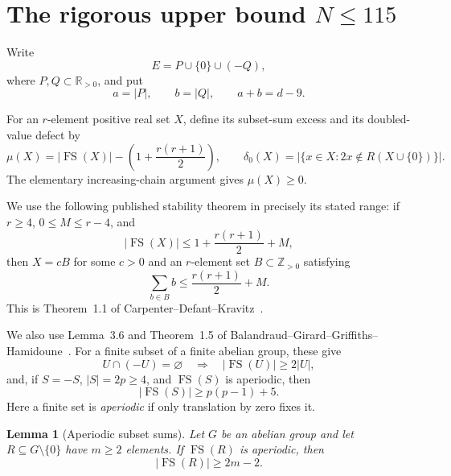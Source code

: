 \documentclass[11pt,a4paper]{article}
\newtheorem{lemma}[theorem]{Lemma}
\theoremstyle{remark}
\newcommand{\FS}{\operatorname{FS}}
\newcommand{\card}[1]{\lvert #1\rvert}
\begin{document}
\section{The rigorous upper bound \texorpdfstring{$N\leq115$}{N <= 115}}
\label{base:sec:upper}

Write
\[
 E=P\cup\{0\}\cup(-Q),
\]
where $P,Q\subset\mathbb R_{>0}$, and put
\[
 a=\card P,\qquad b=\card Q,
 \qquad a+b=d-9.
\]

For an $r$-element positive real set $X$, define its subset-sum excess and its
doubled-value defect by
\[
 \mu(X)=\card{\FS(X)}-\left(1+\frac{r(r+1)}2\right),
 \qquad
 \delta_0(X)=\card{\{x\in X:2x\notin R(X\cup\{0\})\}}.
\]
The elementary increasing-chain argument gives $\mu(X)\geq0$.

We use the following published stability theorem in precisely its stated
range: if $r\geq4$, $0\leq M\leq r-4$, and
\[
 \card{\FS(X)}\leq1+\frac{r(r+1)}2+M,
\]
then $X=cB$ for some $c>0$ and an $r$-element set
$B\subset\mathbb Z_{>0}$ satisfying
\[
 \sum_{b\in B}b\leq\frac{r(r+1)}2+M.
\]
This is Theorem~1.1 of Carpenter--Defant--Kravitz~\cite{CDK2026}.

We also use Lemma~3.6 and Theorem~1.5 of
Balandraud--Girard--Griffiths--Hamidoune~\cite{BGGH2013}.  For a finite
subset of a finite abelian group, these give
\begin{equation}
 U\cap(-U)=\varnothing\quad\Longrightarrow\quad
 \card{\FS(U)}\geq2\card U,
 \label{base:eq:antisymmetric-bound}
\end{equation}
and, if $S=-S$, $\card S=2p\geq4$, and $\FS(S)$ is aperiodic, then
\begin{equation}
 \card{\FS(S)}\geq p(p-1)+5.
 \label{base:eq:symmetric-bound}
\end{equation}
Here a finite set is \emph{aperiodic} if only translation by zero fixes it.

\begin{lemma}[Aperiodic subset sums]\label{base:lem:aperiodic-linear}
Let $G$ be an abelian group and let
$R\subseteq G\setminus\{0\}$ have $m\geq2$ elements.  If $\FS(R)$ is
aperiodic, then
\begin{equation}
 \boxed{\card{\FS(R)}\geq2m-2.}
 \label{base:eq:aperiodic-linear}
\end{equation}
\end{lemma}
\end{document}
